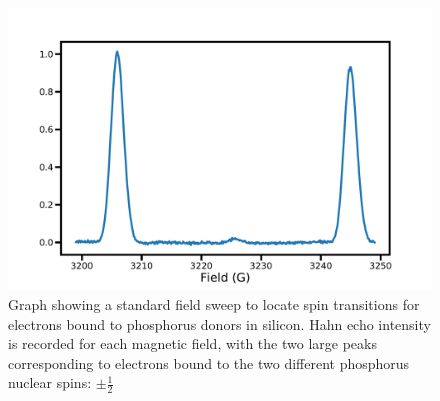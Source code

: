 \begin{figure}
\centering
\includegraphics[width=\columnwidth]{Figures/fieldSweep.pdf}
\caption[Phosphorus field sweep]{Graph showing a standard field sweep to locate spin transitions for electrons bound to phosphorus donors in silicon. Hahn echo intensity is recorded for each magnetic field, with the two large peaks corresponding to electrons bound to the two different phosphorus nuclear spins: $\pm \frac{1}{2}$}
\label{fig:fieldSweep}
\end{figure}

